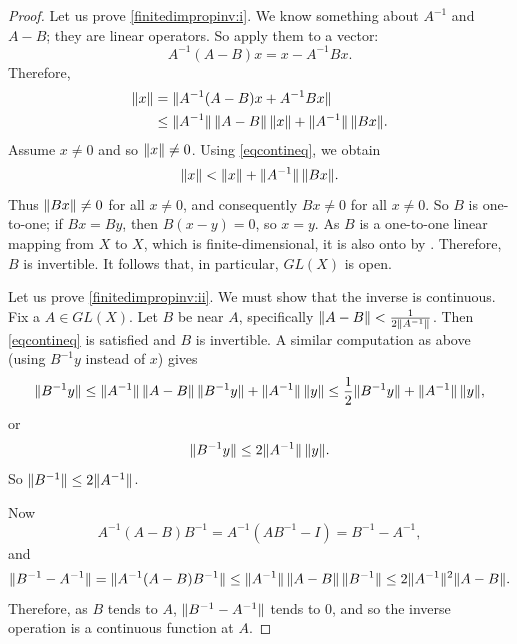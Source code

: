 \begin{proof}
Let us prove \ref{finitedimpropinv:i}.   We know something about $A^{-1}$
and $A-B$; they are linear operators.
So apply them to a vector:
\begin{equation*}
A^{-1}(A-B)x
=
x-A^{-1}Bx .
\end{equation*}
Therefore,
\begin{equation*}
\begin{split}
\lVert {x} \rVert 
& =
\lVert {A^{-1} (A-B)x + A^{-1}Bx} \rVert
\\
& \leq
\lVert {A^{-1}} \rVert\,\lVert {A-B} \rVert\, \lVert {x} \rVert + \lVert {A^{-1}} \rVert\,\lVert {Bx} \rVert .
\end{split}
\end{equation*}
Assume $x \neq 0$ and so $\lVert {x} \rVert \neq 0$.
Using \eqref{eqcontineq}, we obtain
\begin{equation*}
\lVert {x} \rVert < \lVert {x} \rVert + \lVert {A^{-1}} \rVert \, \lVert {Bx} \rVert .
\end{equation*}
Thus $\lVert {Bx} \rVert \not= 0$ for all $x \not= 0$, and consequently
$Bx \not= 0$ for all $x \not= 0$.  So
$B$ is one-to-one; if $Bx = By$, then $B(x-y) = 0$, so $x=y$.
As $B$ is a one-to-one linear mapping from $X$ to $X$, which is finite-dimensional,
it is also onto by .
Therefore, $B$ is invertible.
It follows that, in particular, $GL(X)$ is open.

Let us prove \ref{finitedimpropinv:ii}.
We must show that the inverse is continuous.
Fix a $A \in GL(X)$.  Let $B$ be near $A$,
specifically $\lVert {A-B} \rVert < \frac{1}{2 \lVert {A^{-1}} \rVert}$.
Then \eqref{eqcontineq} is satisfied and $B$ is invertible.
A similar computation as above (using $B^{-1}y$ instead of $x$) gives
\begin{equation*}
\lVert {B^{-1}y} \rVert \leq 
\lVert {A^{-1}} \rVert \, \lVert {A-B} \rVert \,  \lVert {B^{-1}y} \rVert + \lVert {A^{-1}} \rVert \, \lVert {y} \rVert
\leq
\frac{1}{2} \lVert {B^{-1}y} \rVert + \lVert {A^{-1}} \rVert\,\lVert {y} \rVert ,
\end{equation*}
or
\begin{equation*}
\lVert {B^{-1}y} \rVert \leq 
2\lVert {A^{-1}} \rVert\,\lVert {y} \rVert .
\end{equation*}
So
$
\lVert {B^{-1}} \rVert \leq 2 \lVert {A^{-1}} \rVert
$.

Now
\begin{equation*}
A^{-1}(A-B)B^{-1} = 
A^{-1}(AB^{-1}-I) = 
B^{-1}-A^{-1} ,
\end{equation*}
and
\begin{equation*}
\lVert {B^{-1}-A^{-1}} \rVert =
\lVert {A^{-1}(A-B)B^{-1}} \rVert \leq
\lVert {A^{-1}} \rVert\,\lVert {A-B} \rVert\,\lVert {B^{-1}} \rVert
\leq
2\lVert {A^{-1}} \rVert^2
\lVert {A-B} \rVert .
\end{equation*}
Therefore, as $B$ tends to $A$, $\lVert {B^{-1}-A^{-1}} \rVert$ tends to 0, and
so the inverse operation is a continuous function at $A$.
\end{proof}

